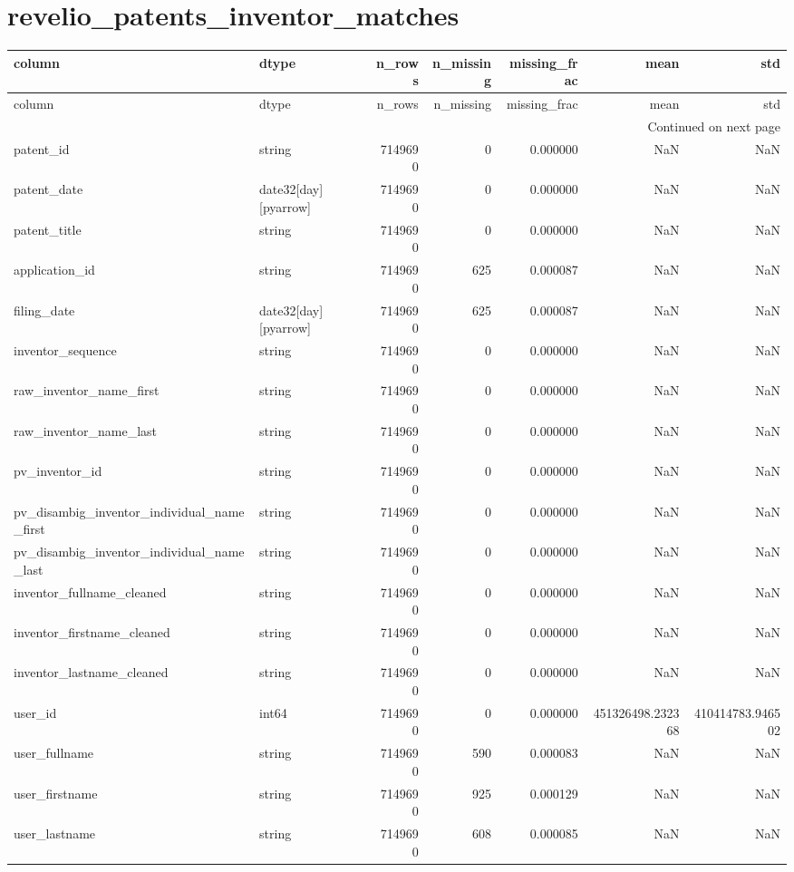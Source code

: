 \documentclass{article}
\begin{document}
\section*{revelio_patents_inventor_matches}
\begin{longtable}{llrrrrr}
\toprule
column & dtype & n_rows & n_missing & missing_frac & mean & std \\
\midrule
\endfirsthead
\toprule
column & dtype & n_rows & n_missing & missing_frac & mean & std \\
\midrule
\endhead
\midrule
\multicolumn{7}{r}{Continued on next page} \\
\midrule
\endfoot
\bottomrule
\endlastfoot
patent_id & string & 7149690 & 0 & 0.000000 & NaN & NaN \\
patent_date & date32[day][pyarrow] & 7149690 & 0 & 0.000000 & NaN & NaN \\
patent_title & string & 7149690 & 0 & 0.000000 & NaN & NaN \\
application_id & string & 7149690 & 625 & 0.000087 & NaN & NaN \\
filing_date & date32[day][pyarrow] & 7149690 & 625 & 0.000087 & NaN & NaN \\
inventor_sequence & string & 7149690 & 0 & 0.000000 & NaN & NaN \\
raw_inventor_name_first & string & 7149690 & 0 & 0.000000 & NaN & NaN \\
raw_inventor_name_last & string & 7149690 & 0 & 0.000000 & NaN & NaN \\
pv_inventor_id & string & 7149690 & 0 & 0.000000 & NaN & NaN \\
pv_disambig_inventor_individual_name_first & string & 7149690 & 0 & 0.000000 & NaN & NaN \\
pv_disambig_inventor_individual_name_last & string & 7149690 & 0 & 0.000000 & NaN & NaN \\
inventor_fullname_cleaned & string & 7149690 & 0 & 0.000000 & NaN & NaN \\
inventor_firstname_cleaned & string & 7149690 & 0 & 0.000000 & NaN & NaN \\
inventor_lastname_cleaned & string & 7149690 & 0 & 0.000000 & NaN & NaN \\
user_id & int64 & 7149690 & 0 & 0.000000 & 451326498.232368 & 410414783.946502 \\
user_fullname & string & 7149690 & 590 & 0.000083 & NaN & NaN \\
user_firstname & string & 7149690 & 925 & 0.000129 & NaN & NaN \\
user_lastname & string & 7149690 & 608 & 0.000085 & NaN & NaN \\

\end{longtable}
\end{document}
